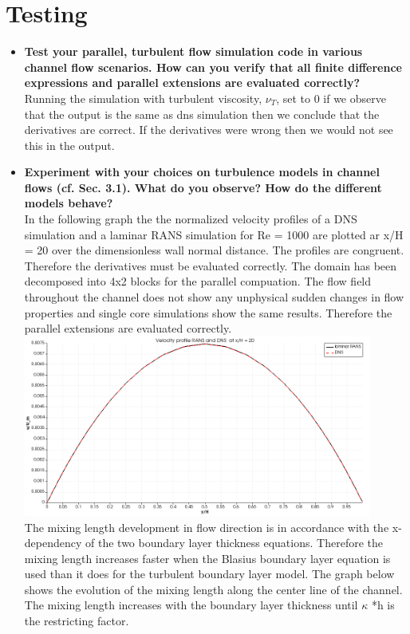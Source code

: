 \documentclass[a4paper]{article}
\begin{document}
\section{Testing}
\begin{itemize}
	\item \textbf{Test your parallel, turbulent flow simulation code in various channel flow scenarios. How can you verify that all finite difference expressions and parallel extensions are evaluated correctly?}\\
	Running the simulation with turbulent viscosity, $\nu_{T}$, set to 0 if we observe that the output is the same as dns simulation then we conclude that the derivatives are correct. If the derivatives were wrong then we would not see this in the output.

 
	\item \textbf{Experiment with your choices on turbulence models in channel flows (cf. Sec. 3.1). What do you observe? How do the different models behave?}\\
	In the following graph the the normalized velocity profiles of a DNS simulation and a laminar RANS simulation for Re = 1000 are plotted ar x/H = 20 over the dimensionless wall normal distance. The profiles are congruent. Therefore the derivatives must be evaluated correctly. The domain has been decomposed into 4x2 blocks for the parallel compuation. The flow field throughout the channel does not show any unphysical sudden changes in flow properties and single core simulations show the same results. Therefore the parallel extensions are evaluated correctly.\\ 
\includegraphics[width=0.9\textwidth]{pictures/1_Velocity_profile_RANS_and_DNS_at_20}\\

The mixing length development in flow direction is in accordance with the x-dependency of the two boundary layer thickness equations. Therefore the mixing length increases faster when the Blasius boundary layer equation is used than it does for the turbulent boundary layer model. The graph below shows the evolution of the mixing length along the center line of the channel. The mixing length increases with the boundary layer thickness until $\kappa$ *h is the restricting factor. \\


\end{itemize}
\end{document}
